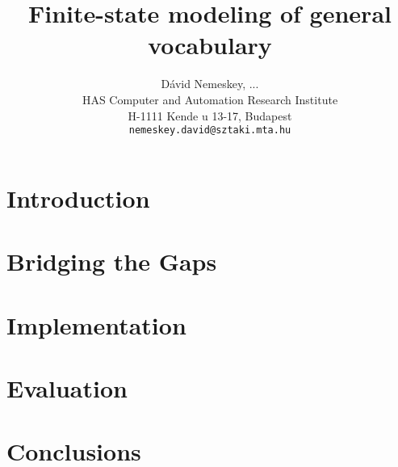 \documentclass{article}
\title{Finite-state modeling of general vocabulary}
\author{D\'avid Nemeskey, ...\\
 HAS Computer and Automation Research Institute\\
   H-1111 Kende u 13-17, Budapest\\
 {\tt nemeskey.david@sztaki.mta.hu}}
\date{}
\begin{document}
\maketitle\vspace*{-10mm}

\begin{abstract}
\end{abstract}

\section{Introduction}

\section{Bridging the Gaps}
\label{sec:bridging}

\section{Implementation}
\label{sec:implementation}

\section{Evaluation}
\label{sec:evaluation}

\section{Conclusions}
\label{sec:conclusion}

\cite{Karlsson:1990} %
\cite{Hulden:2011} %
\cite{Peltonen:2011} %
\cite{Tapanainen:1996} %



\end{document}
